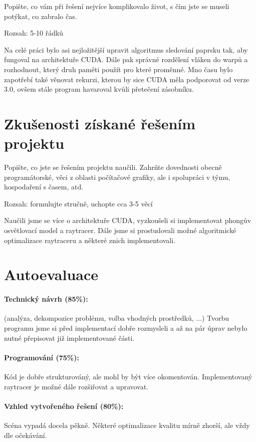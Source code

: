 \documentclass[12pt,a4paper,titlepage,final]{report}
\begin{document}
Popište, co vám při řešení nejvíce komplikovalo život, s čím jste se museli
potýkat, co zabralo čas.

Rozsah: 5-10 řádků

Na celé práci bylo asi nejložitější upravit algoritmus sledování paprsku tak,
aby fungoval na architektuře CUDA. Dále pak správné rozdělení vláken do warpů 
a rozhodnout, který druh paměti použít pro které proměnné. Mno času bylo zapotřebí  
také věnovat rekurzi, kterou by sice CUDA měla podporovat od verze 3.0,  
ovšem stále program havaroval kvůli přetečení zásobníku.

\section{Zkušenosti získané řešením projektu}

Popište, co jste se řešením projektu naučili. Zahrňte dovednosti obecně
programátorské, věci z oblasti počítačové grafiky, ale i spolupráci v týmu,
hospodaření s časem, atd.

Rozsah: formulujte stručně, uchopte cca 3-5 věcí

Naučili jsme se více o architektuře CUDA, vyzkoušeli si implementovat phongův osvětlovací model a
raytracer. Dále jsme si prostudovali možné algoritmické optimalizace raytraceru a některé znich implementovali.

\section{Autoevaluace}

\paragraph{Technický návrh (85\%):} (analýza, dekompozice problému, volba
vhodných prostředků, $\ldots$) 
Tvorbu programu jsme si před implementací dobře rozmysleli a až na pár úprav nebylo nutné přepisovat již implementované části.

\paragraph{Programování (75\%):}
Kód je dobře strukturováný, ale mohl by být více okomentován. 
Implementovaný raytracer je možné dále rozšiřovat a upravovat.

\paragraph{Vzhled vytvořeného řešení (80\%):} 
Scéna vypadá docela pěkně. Některé optimalizace kvalitu mírně zhorší, ale vždy dle očekávání.
\end{document}
